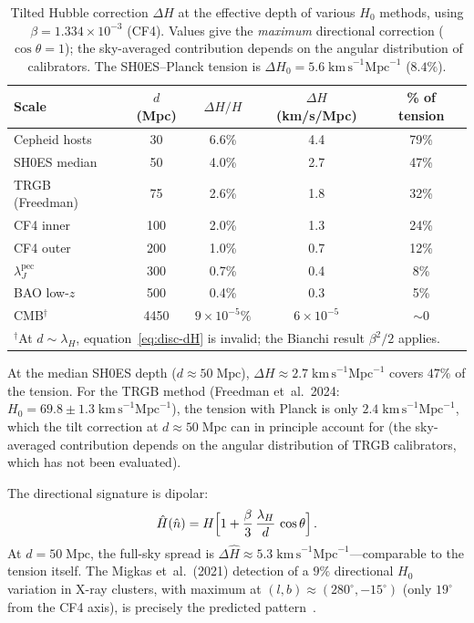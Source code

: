 \begin{table}[t]
\centering
\footnotesize
\setlength{\tabcolsep}{3pt}
\caption{Tilted Hubble correction $\Delta H$ at the effective
depth of various $H_0$ methods, using $\beta = 1.334 \times
10^{-3}$ (CF4).  Values give the \emph{maximum} directional
correction ($\cos\theta = 1$); the sky-averaged contribution
depends on the angular distribution of calibrators.
The SH0ES--Planck tension is
$\Delta H_0 = 5.6\;\mathrm{km\,s}^{-1}\mathrm{Mpc}^{-1}$
($8.4\%$).}
\label{tab:disc-tilted-H0}
\begin{tabular}{lcccc}
\toprule
Scale & $d$ (Mpc) & $\Delta H/H$ &
  $\Delta H$ (km/s/Mpc) &
  \% of tension \\
\midrule
Cepheid hosts    &  30 & 6.6\% & 4.4  & 79\% \\
SH0ES median     &  50 & 4.0\% & 2.7  & 47\% \\
TRGB (Freedman)  &  75 & 2.6\% & 1.8  & 32\% \\
CF4 inner        & 100 & 2.0\% & 1.3  & 24\% \\
CF4 outer        & 200 & 1.0\% & 0.7  & 12\% \\
$\lambda_J^{\mathrm{pec}}$ & 300 & 0.7\% & 0.4 & 8\% \\
BAO low-$z$      & 500 & 0.4\% & 0.3  & 5\% \\
CMB$^{\dagger}$  & 4450 & $9 \times 10^{-5}\%$ &
  $6 \times 10^{-5}$ & $\sim 0$ \\
\bottomrule
\multicolumn{5}{l}{\scriptsize $^{\dagger}$At $d \sim \lambda_H$,
equation~\eqref{eq:disc-dH} is invalid; the Bianchi result
$\beta^2/2$ applies.}
\end{tabular}
\end{table}

At the median SH0ES depth ($d \approx 50\;\mathrm{Mpc}$),
$\Delta H \approx 2.7\;\mathrm{km\,s}^{-1}\mathrm{Mpc}^{-1}$
covers $47\%$ of the tension.  For the TRGB method
(Freedman et~al.\ 2024:
$H_0 = 69.8 \pm 1.3\;\mathrm{km\,s}^{-1}\mathrm{Mpc}^{-1}$),
the tension with Planck is only
$2.4\;\mathrm{km\,s}^{-1}\mathrm{Mpc}^{-1}$, which the tilt
correction at $d \approx 50\;\mathrm{Mpc}$ can in principle
account for (the sky-averaged contribution depends on the angular
distribution of TRGB calibrators, which has not been evaluated).

The directional signature is dipolar:
\begin{equation}\label{eq:disc-H-dir}
\hat{H}(\hat{n})
= H\Bigl[1
  + \frac{\beta}{3}\,\frac{\lambda_H}{d}\,\cos\theta\Bigr]\,.
\end{equation}
At $d = 50\;\mathrm{Mpc}$, the full-sky spread is
$\Delta\hat{H} \approx 5.3\;\mathrm{km\,s}^{-1}
\mathrm{Mpc}^{-1}$---comparable to the tension itself.  The
Migkas et~al.\ (2021) detection of a $9\%$ directional $H_0$
variation in X-ray clusters, with maximum at
$(l, b) \approx (280^\circ, -15^\circ)$ (only $19^\circ$ from
the CF4 axis), is precisely the predicted pattern~\cite{Migkas2021}.


